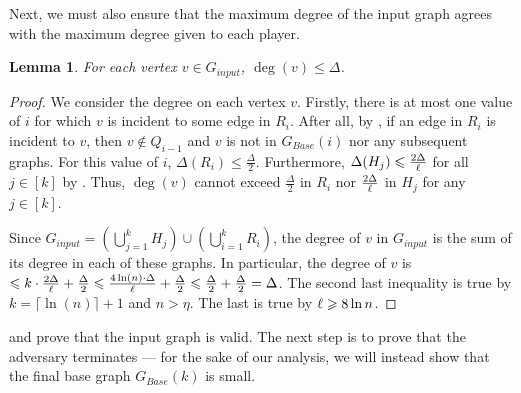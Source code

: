 \documentclass[11pt]{article}
\newtheorem{lemma}{Lemma}[section]
\theoremstyle{definition}
\renewcommand{\leq}{\leqslant}
\renewcommand{\geq}{\geqslant}
\renewcommand{\le}{\leq}
\renewcommand{\ge}{\geq}
\begin{document}
Next, we must also ensure that the maximum degree of the input graph agrees with the maximum degree given to each player. 
\begin{lemma}\label{valid-graph}
For each vertex $v\in G_{input}$, $\deg{(v)}\le \Delta$.
\end{lemma}
\begin{proof}
We consider the degree on each vertex $v$. Firstly, there is at most one value of $i$ for which $v$ is incident to some edge in $R_i$. After all, by , if an edge in $R_i$ is incident to $v$, then $v\not\in Q_{i-1}$ and $v$ is not in $G_{Base}(i)$ nor any subsequent graphs. For this value of $i$, $\Delta(R_i)\le \frac{\Delta}2$. Furthermore, $\Delta(H_j)\le \frac{2\Delta}{\distribFac}$ for all $j\in [k]$ by . Thus, $\deg(v)$ cannot exceed $\frac{\Delta}2$ in $R_i$ nor $\frac{2\Delta}{\ell}$ in $H_j$ for any $j\in [k]$. 

Since $G_{input}=\left(\bigcup_{j=1}^k H_j\right)\cup\left(\bigcup_{i=1}^k R_i\right)$, the degree of $v$ in $G_{input}$ is the sum of its degree in each of these graphs. In particular, the degree of $v$ is $\le k\cdot \frac{2\Delta}{\distribFac}+\frac{\Delta}2\le \frac{4\ln(n)\cdot\Delta}{\distribFac}+\frac{\Delta}2\le\frac{\Delta}2+\frac{\Delta}2=\Delta$. The second last inequality is true by $k=\lceil \ln(n)\rceil+1$ and $n>\eta$. The last is true by ${\distribFac}\ge 8\ln n$. 
\end{proof}

 and  prove that the input graph is valid. The next step is to prove that the adversary terminates --- for the sake of our analysis, we will instead show that the final base graph $G_{Base}(k)$ is small. 
\end{document}
